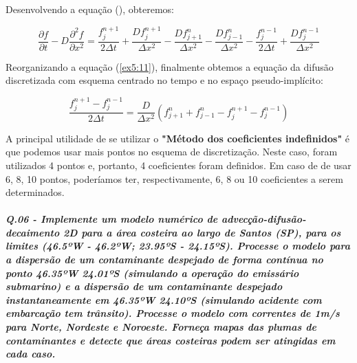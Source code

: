 \documentclass[11pt]{article}
\begin{document}
Desenvolvendo a equação (), obteremos:

\begin{equation}
    \frac{\partial{f}}{\partial{t}} - D\frac{\partial^2{f}}{\partial{x^2}} =
    \frac{f^{n+1}_{j}}{2\Delta{t}} + \frac{Df^{n+1}_{j}}{\Delta{x^2}} -
    \frac{Df^{n}_{j+1}}{\Delta{x^2}} - \frac{Df^{n}_{j-1}}{\Delta{x^2}} -
    \frac{f^{n-1}_{j}}{2\Delta{t}} + \frac{Df^{n-1}_{j}}{\Delta{x^2}}
    \label{ex5:11}
\end{equation}

Reorganizando a equação (\ref{ex5:11}), finalmente obtemos a equação da
difusão discretizada com esquema centrado no tempo e no espaço
pseudo-implícito:

\begin{equation}
    \frac{f^{n+1}_{j} - f^{n-1}_{j}}{2\Delta{t}} =
    \frac{D}{\Delta{x^2}}(f^{n}_{j+1} + f^{n}_{j-1} - f^{n+1}_{j} - f^{n-1}_{j})
    \label{ex5:12}
\end{equation}

A principal utilidade de se utilizar o \textbf{"Método dos coeficientes
indefinidos"} é que podemos usar mais pontos no esquema de
discretização. Neste caso, foram utilizados 4 pontos e, portanto, 4
coeficientes foram definidos. Em caso de de usar 6, 8, 10 pontos,
poderíamos ter, respectivamente, 6, 8 ou 10 coeficientes a serem
determinados.

    \subparagraph{Q.06 - Implemente um modelo numérico de
advecção-difusão-decaimento 2D para a área costeira ao largo de Santos
(SP), para os limites (46.5ºW - 46.2ºW; 23.95ºS - 24.15ºS). Processe o
modelo para a dispersão de um contaminante despejado de forma contínua
no ponto 46.35ºW 24.01ºS (simulando a operação do emissário submarino) e
a dispersão de um contaminante despejado instantaneamente em 46.35ºW
24.10ºS (simulando acidente com embarcação tem trânsito). Processe o
modelo com correntes de 1m/s para Norte, Nordeste e Noroeste. Forneça
mapas das plumas de contaminantes e detecte que áreas costeiras podem
ser atingidas em cada
caso.}\label{q.06---implemente-um-modelo-numuxe9rico-de-advecuxe7uxe3o-difusuxe3o-decaimento-2d-para-a-uxe1rea-costeira-ao-largo-de-santos-sp-para-os-limites-46.5uxbaw---46.2uxbaw-23.95uxbas---24.15uxbas.-processe-o-modelo-para-a-dispersuxe3o-de-um-contaminante-despejado-de-forma-contuxednua-no-ponto-46.35uxbaw-24.01uxbas-simulando-a-operauxe7uxe3o-do-emissuxe1rio-submarino-e-a-dispersuxe3o-de-um-contaminante-despejado-instantaneamente-em-46.35uxbaw-24.10uxbas-simulando-acidente-com-embarcauxe7uxe3o-tem-truxe2nsito.-processe-o-modelo-com-correntes-de-1ms-para-norte-nordeste-e-noroeste.-forneuxe7a-mapas-das-plumas-de-contaminantes-e-detecte-que-uxe1reas-costeiras-podem-ser-atingidas-em-cada-caso.}





    
\end{document}
